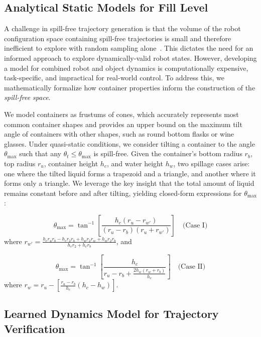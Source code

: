 \subsection{Analytical Static Models for Fill Level}
\label{sec:constrained:analytical}

A challenge in spill-free trajectory generation is that the volume of the robot configuration space containing spill-free trajectories is small and therefore inefficient to explore with random sampling alone~\cite{zach}.
This dictates the need for an informed approach to explore dynamically-valid robot states.
However, developing a model for combined robot and object dynamics is computationally expensive, task-specific, and impractical for real-world control.
To address this, we mathematically formalize how container properties inform the construction of the \textit{spill-free space}.

We model containers as frustums of cones, which accurately represents most common container shapes and provides an upper bound on the maximum tilt angle of containers with other shapes, such as round bottom flasks or wine glasses.
Under quasi-static conditions, we consider tilting a container to the angle $\theta_{\max}$ such that any $\theta_t \leq \theta_{\max}$ is spill-free.
Given the container's bottom radius $r_b$, top radius $r_u$, container height $h_c$, and water height $h_w$, two spillage cases arise: one where the tilted liquid forms a trapezoid and a triangle, and another where it forms only a triangle.
We leverage the key insight that the total amount of liquid remains constant before and after tilting, yielding closed-form expressions for $\theta_{\max}$:

\begin{equation}
\theta_{\max} = \tan^{-1} \!\left[\frac{h_c(r_u - r_{w'})}{(r_u - r_b)(r_u + r_{w'})}\right] \quad \text{(Case~I)}
\label{eq:constrained:caseI}
\end{equation}
where $r_{w'} = \frac{h_c r_u r_b - h_c r_2 r_b + h_w r_2 r_w + h_w r_2 r_b}{h_c r_2 + h_c r_b}$, and

\begin{equation}
\theta_{\max} = \tan^{-1} \!\left[\frac{h_c}{r_u - r_b + \tfrac{2h_w(r_w + r_b)}{h_c}}\right] \quad \text{(Case~II)}
\label{eq:constrained:caseII}
\end{equation}
where $r_w = r_u - \left[\frac{r_u - r_b}{h_c}(h_c - h_w)\right]$.

\subsection{Learned Dynamics Model for Trajectory Verification}
\label{sec:constrained:learned}

